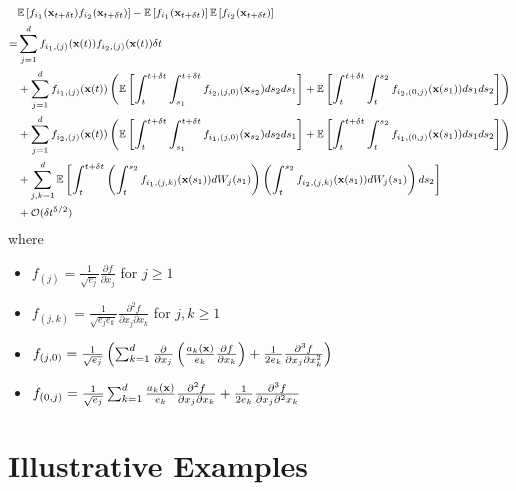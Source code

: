 \begin{equation} \label{eq:cov_est}
\footnotesize
\begin{aligned}
&\mathbb{E} \left[ f_{i_1}(\mathbf{x}_{t + \delta t}) f_{i_2}(\mathbf{x}_{t + \delta t}) \right]
- \mathbb{E} \left[ f_{i_1}(\mathbf{x}_{t + \delta t}) \right] \mathbb{E} \left[ f_{i_2}(\mathbf{x}_{t + \delta t}) \right] \\
=&
 \sum_{j=1}^d f_{{i_1},(j)}(\mathbf{x}(t)) f_{{i_2},(j)}(\mathbf{x}(t)) \delta t \\
&+ \sum_{j=1}^d f_{{i_1},(j)}(\mathbf{x}(t)) \left( \mathbb{E} \left[ \int_t^{t+\delta t} \int_{s_1}^{t+\delta t} f_{{i_2},(j,0)}(\mathbf{x}_{s_2}) ds_2 ds_1 \right]
+ \mathbb{E} \left[  \int_t^{t+\delta t} \int_t^{s_2} f_{{i_2},(0,j)}(\mathbf{x}(s_1)) ds_1 ds_2\right] \right) \\
&+  \sum_{j=1}^d f_{{i_2},(j)}(\mathbf{x}(t)) \left( \mathbb{E} \left[ \int_t^{t+\delta t} \int_{s_1}^{t + \delta t} f_{{i_1},(j,0)}(\mathbf{x}_{s_2}) ds_2 ds_1 \right]
+ \mathbb{E} \left[ \int_t^{t+\delta t} \int_t^{s_2} f_{{i_1},(0,j)}(\mathbf{x}(s_1)) ds_1 ds_2 \right] \right) \\
&+ \sum_{j, k=1}^d \mathbb{E} \left[ \int_t^{t+\delta t}\left( \int_t^{s_2} f_{{i_1},(j,k)}(\mathbf{x}(s_1)) dW_j(s_1)  \right) \left(  \int_t^{s_2} f_{{i_2},(j,k)}(\mathbf{x}(s_1)) dW_j(s_1) \right) ds_2 \right] \\
&+ \mathcal{O} (\delta t^{5/2})
\end{aligned}
\end{equation}
%
where
\begin{itemize}
\item $f_{(j)} = \frac{1}{\sqrt{e_j}} \frac{\partial f}{\partial x_j}$ for $j \ge 1$
\item $f_{(j, k)} = \frac{1}{\sqrt{e_j e_k}} \frac{\partial^2 f}{\partial x_j \partial x_k}$ for $j,k \ge 1$
\item $f_{(j,0)} = \frac{1}{\sqrt{e_j}} \left( \sum_{k=1}^d \frac{\partial}{\partial x_j} \left( \frac{a_k(\mathbf{x})}{e_k} \frac{\partial f}{\partial x_k} \right) + \frac{1}{2 e_k} \frac{\partial^3 f}{\partial x_j \partial x_k^2} \right)$
\item $f_{(0, j)} = \frac{1}{\sqrt{e_j}} \sum_{k=1}^d \frac{a_k(\mathbf{x})}{e_k} \frac{\partial^2 f}{\partial x_j \partial x_k} +\frac{1}{2 e_k}  \frac{\partial^3 f}{\partial x_j \partial^2 x_k}$
\end{itemize}

\section{Illustrative Examples}

